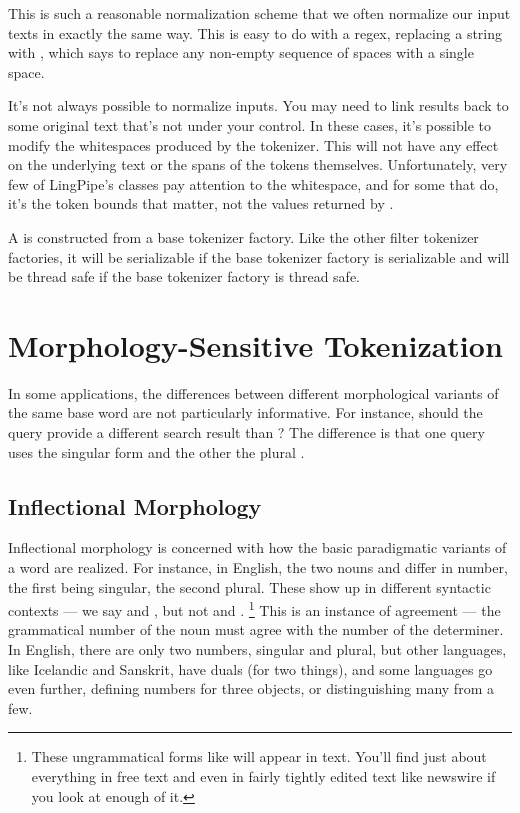 This is such a reasonable normalization scheme that we often normalize
our input texts in exactly the same way.  This is easy to do with a
regex, replacing a string  with
, which says to replace
any non-empty sequence of spaces with a single space. 

It's not always possible to normalize inputs.  You may need to link
results back to some original text that's not under your control.  In
these cases, it's possible to modify the whitespaces produced by the
tokenizer.  This will not have any effect on the underlying text or
the spans of the tokens themselves.  Unfortunately, very few of
LingPipe's classes pay attention to the whitespace, and for some that
do, it's the token bounds that matter, not the values returned by
.

A  is constructed from a base
tokenizer factory.  Like the other filter tokenizer factories, it will
be serializable if the base tokenizer factory is serializable and will
be thread safe if the base tokenizer factory is thread safe.


\section{Morphology-Sensitive Tokenization} 

In some applications, the differences between different morphological
variants of the same base word are not particularly informative.  For
instance, should the query  provide a different
search result than ?  The difference is that one
query uses the singular form  and the other the
plural .  


\subsection{Inflectional Morphology}

Inflectional morphology is concerned with how the basic paradigmatic
variants of a word are realized.  For instance, in English, the two
nouns  and  differ in number, the first
being singular, the second plural.  These show up in different
syntactic contexts --- we say  and
, but not 
and .%
%
\footnote{These ungrammatical forms like 
will appear in text.  You'll find just about everything in free text
and even in fairly tightly edited text like newswire if you look at
enough of it.}
%
This is an instance of agreement --- the grammatical number of the
noun must agree with the number of the determiner.  In English, there
are only two numbers, singular and plural, but other languages, like
Icelandic and Sanskrit, have duals (for two things), and some
languages go even further, defining numbers for three objects, or
distinguishing many from a few.

